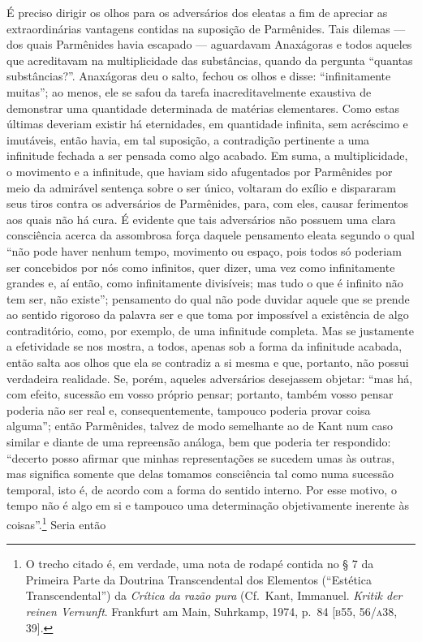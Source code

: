 É preciso dirigir os olhos para os adversários dos eleatas a fim de apreciar
as extraordinárias vantagens contidas na suposição de Parmênides. Tais
dilemas --- dos quais Parmênides havia escapado --- aguardavam Anaxágoras e
todos aqueles que acreditavam na multiplicidade das substâncias, quando da
pergunta ``quantas substâncias?''. Anaxágoras deu o salto, fechou os olhos e
disse: ``infinitamente muitas''; ao menos, ele se safou da tarefa
inacreditavelmente exaustiva de demonstrar uma quantidade determinada de
matérias elementares. Como estas últimas deveriam existir há eternidades, em
quantidade infinita, sem acréscimo e imutáveis, então havia, em tal
suposição, a contradição pertinente a uma infinitude fechada a ser pensada
como algo acabado. Em suma, a multiplicidade, o movimento e a infinitude, que
haviam sido afugentados por Parmênides por meio da admirável sentença sobre o
ser único, voltaram do exílio e dispararam seus tiros contra os adversários
de Parmênides, para, com eles, causar ferimentos aos quais não há cura. É
evidente que tais adversários não possuem uma clara consciência acerca da
assombrosa força daquele pensamento eleata segundo o qual ``não pode haver
nenhum tempo, movimento ou espaço, pois todos só poderiam ser concebidos por
nós como infinitos, quer dizer, uma vez como infinitamente grandes e, aí
então, como infinitamente divisíveis; mas tudo o que é infinito não tem ser,
não existe''; pensamento do qual não pode duvidar aquele que se prende ao
sentido rigoroso da palavra ser e que toma por impossível a existência de
algo contraditório, como, por exemplo, de uma infinitude completa. Mas se
justamente a efetividade se nos mostra, a todos, apenas sob a forma da
infinitude acabada, então salta aos olhos que ela se contradiz a si mesma e
que, portanto, não possui verdadeira realidade. Se, porém, aqueles
adversários desejassem objetar: ``mas há, com efeito, sucessão em vosso
próprio pensar; portanto, também vosso pensar poderia não ser real e,
consequentemente, tampouco poderia provar coisa alguma''; então Parmênides,
talvez de modo semelhante ao de Kant num caso similar e diante de uma
repreensão análoga, bem que poderia ter respondido: ``decerto posso afirmar
que minhas representações se sucedem umas às outras, mas significa somente
que delas tomamos consciência tal como numa sucessão temporal, isto é, de
acordo com a forma do sentido interno. Por esse motivo, o tempo não é algo em
si e tampouco uma determinação objetivamente inerente às coisas''.\footnote
{ O trecho citado é, em verdade, uma nota de rodapé contida no § 7 da
Primeira Parte da Doutrina Transcendental dos Elementos
(``Estética Transcendental'') da \textit{Crítica da razão pura}
(Cf.~Kant, Immanuel. \textit{Kritik der reinen Vernunft}. Frankfurt am Main,
Suhrkamp, 1974, p.~84 [\textsc{b}55, 56/\textsc{a}38, 39].} Seria então
